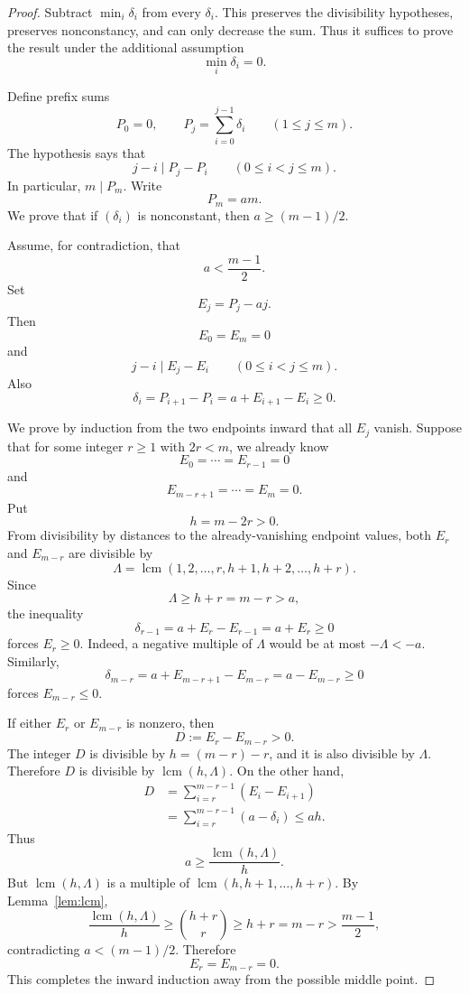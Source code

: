 \documentclass[11pt]{article}
\theoremstyle{remark}
\newcommand{\lcm}{\operatorname{lcm}}
\numberwithin{equation}{section}
\begin{document}
\begin{proof}
Subtract $\min_i\delta_i$ from every $\delta_i$.
This preserves the divisibility hypotheses, preserves nonconstancy, and can only decrease the sum.
Thus it suffices to prove the result under the additional assumption
\[
        \min_i\delta_i=0.
\]

Define prefix sums
\[
        P_0=0,
        \qquad
        P_j=\sum_{i=0}^{j-1}\delta_i
        \qquad (1\le j\le m).
\]
The hypothesis says that
\[
        j-i\mid P_j-P_i
        \qquad
        (0\le i<j\le m).
\]
In particular, $m\mid P_m$.
Write
\[
        P_m=am.
\]
We prove that if $(\delta_i)$ is nonconstant, then $a\ge (m-1)/2$.

Assume, for contradiction, that
\[
        a<\frac{m-1}{2}.
\]
Set
\[
        E_j=P_j-aj.
\]
Then
\[
        E_0=E_m=0
\]
and
\[
        j-i\mid E_j-E_i
        \qquad
        (0\le i<j\le m).
\]
Also
\[
        \delta_i=P_{i+1}-P_i=a+E_{i+1}-E_i\ge0.
\]

We prove by induction from the two endpoints inward that all $E_j$ vanish.
Suppose that for some integer $r\ge1$ with $2r<m$, we already know
\[
        E_0=\cdots=E_{r-1}=0
\]
and
\[
        E_{m-r+1}=\cdots=E_m=0.
\]
Put
\[
        h=m-2r>0.
\]
From divisibility by distances to the already-vanishing endpoint values, both $E_r$ and $E_{m-r}$ are divisible by
\[
        \Lambda=
        \lcm(1,2,\ldots,r,h+1,h+2,\ldots,h+r).
\]
Since
\[
        \Lambda\ge h+r=m-r>a,
\]
the inequality
\[
        \delta_{r-1}=a+E_r-E_{r-1}=a+E_r\ge0
\]
forces $E_r\ge0$.
Indeed, a negative multiple of $\Lambda$ would be at most $-\Lambda<-a$.
Similarly,
\[
        \delta_{m-r}=a+E_{m-r+1}-E_{m-r}=a-E_{m-r}\ge0
\]
forces $E_{m-r}\le0$.

If either $E_r$ or $E_{m-r}$ is nonzero, then
\[
        D:=E_r-E_{m-r}>0.
\]
The integer $D$ is divisible by $h=(m-r)-r$, and it is also divisible by $\Lambda$.
Therefore $D$ is divisible by $\lcm(h,\Lambda)$.
On the other hand,
\[
\begin{aligned}
        D
        &=
        \sum_{i=r}^{m-r-1}(E_i-E_{i+1}) \\
        &=
        \sum_{i=r}^{m-r-1}(a-\delta_i)
        \le ah.
\end{aligned}
\]
Thus
\[
        a\ge \frac{\lcm(h,\Lambda)}{h}.
\]
But $\lcm(h,\Lambda)$ is a multiple of $\lcm(h,h+1,\ldots,h+r)$.
By Lemma~\ref{lem:lcm},
\[
        \frac{\lcm(h,\Lambda)}{h}
        \ge
        \binom{h+r}{r}
        \ge
        h+r
        =m-r
        >\frac{m-1}{2},
\]
contradicting $a<(m-1)/2$.
Therefore
\[
        E_r=E_{m-r}=0.
\]
This completes the inward induction away from the possible middle point.


\end{proof}
\end{document}
